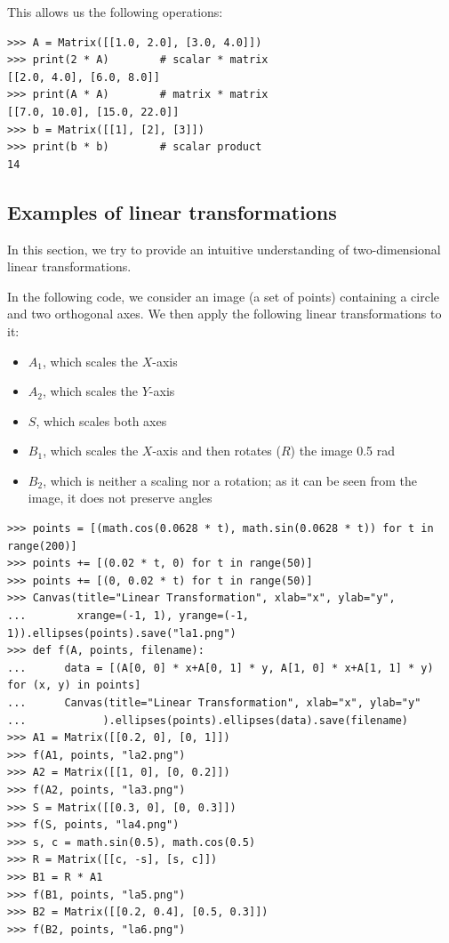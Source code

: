 \documentclass[justified, sixbynine]{tufte-book}
\def\ft{\small\tt}
\theoremstyle{plain}%
\newtheorem * {corollary}{Corollary}
\theoremstyle{definition}
\theoremstyle{remark}
\newtheorem * {remark}{Remark}
\newtheorem * {note}{Note}
\begin{document}
\begin{fullwidth}
This allows us the following operations:
\begin{lstlisting}[caption={in file: {\ft nlib.py}}]
>>> A = Matrix([[1.0, 2.0], [3.0, 4.0]])
>>> print(2 * A)        # scalar * matrix
[[2.0, 4.0], [6.0, 8.0]]
>>> print(A * A)        # matrix * matrix
[[7.0, 10.0], [15.0, 22.0]]
>>> b = Matrix([[1], [2], [3]])
>>> print(b * b)        # scalar product
14
\end{lstlisting}


\goodbreak\subsection{Examples of linear transformations}


In this section, we try to provide an intuitive understanding of two-dimensional linear transformations.

In the following code, we consider an image (a set of points) containing a circle and two orthogonal axes. We then apply the following linear transformations to it:
\begin{itemize}
\item $A_1$, which scales the $X$-axis
\item $A_2$, which scales the $Y$-axis
\item $S$, which scales both axes
\item $B_1$, which scales the $X$-axis and then rotates ($R$) the image 0.5 rad
\item $B_2$, which is neither a scaling nor a rotation; as it can be seen from the image, it does not preserve angles
\end{itemize}

\begin{lstlisting}[caption={in file: {\ft nlib.py}}]
>>> points = [(math.cos(0.0628 * t), math.sin(0.0628 * t)) for t in range(200)]
>>> points += [(0.02 * t, 0) for t in range(50)]
>>> points += [(0, 0.02 * t) for t in range(50)]
>>> Canvas(title="Linear Transformation", xlab="x", ylab="y", 
...        xrange=(-1, 1), yrange=(-1, 1)).ellipses(points).save("la1.png")
>>> def f(A, points, filename):
...      data = [(A[0, 0] * x+A[0, 1] * y, A[1, 0] * x+A[1, 1] * y) for (x, y) in points]
...      Canvas(title="Linear Transformation", xlab="x", ylab="y"
...            ).ellipses(points).ellipses(data).save(filename)
>>> A1 = Matrix([[0.2, 0], [0, 1]])
>>> f(A1, points, "la2.png")
>>> A2 = Matrix([[1, 0], [0, 0.2]])
>>> f(A2, points, "la3.png")
>>> S = Matrix([[0.3, 0], [0, 0.3]])
>>> f(S, points, "la4.png")
>>> s, c = math.sin(0.5), math.cos(0.5)
>>> R = Matrix([[c, -s], [s, c]])
>>> B1 = R * A1
>>> f(B1, points, "la5.png")
>>> B2 = Matrix([[0.2, 0.4], [0.5, 0.3]])
>>> f(B2, points, "la6.png")
\end{lstlisting}


\end{fullwidth}
\end{document}
